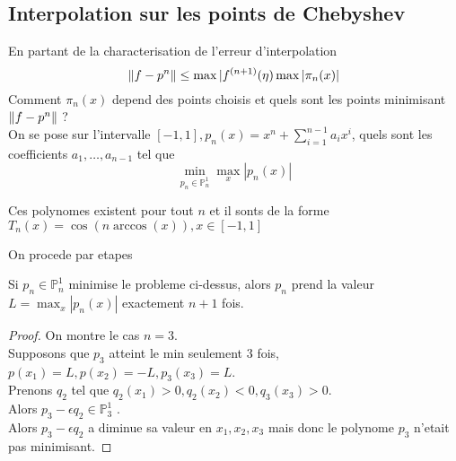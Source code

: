 \documentclass[../main.tex]{subfiles}
\begin{document}
\subsection{Interpolation sur les points de Chebyshev}
En partant de la characterisation de l'erreur d'interpolation
\[ 
\left\lVert f- p^{n}\right\rVert \leq  \max | f^{( n+1) } ( \eta) \max |\pi_n( x) |
\]
Comment $\pi_n( x) $ depend des points choisis et quels sont les points minimisant $ \left\lVert f-p^{n}\right\rVert $ ?\\
On se pose sur l'intervalle $ [ -1,1], p_n( x) = x^{n} +  \sum_{ i=1}^{n-1} a_i x^{i} $, quels sont les coefficients $a_1,\ldots, a_{n-1} $ tel que 
\[ 
\min_{p_n \in \mathbb{P}_n^{1}} \max_{x} |p_n( x) |
\]
\begin{thm}
	Ces polynomes existent pour tout $n$ et il sonts de la forme $T_n( x) = \cos ( n \arccos( x) ) , x\in [ -1,1] $ 
\end{thm}
On procede par etapes
\begin{propo}
Si $p_n\in \mathbb{P}_n^{1}$ minimise le probleme ci-dessus, alors $p_n$ prend la valeur $L = \max_{x} |p_n( x) |$ exactement $n+1$ fois.
\end{propo}
\begin{proof}
On montre le cas $n=3$.\\
Supposons que $p_3$ atteint le min seulement 3 fois, $p( x_1) =L, p( x_2) = -L, p_3 ( x_3) = L$.\\
Prenons $q_2$ tel que $ q_2( x_1) > 0 , q_2( x_2) < 0 , q_3( x_3) >0$.\\
Alors $ p_3- \epsilon q_2 \in \mathbb{P}_3^{1 }$ .\\
Alors $p_3-\epsilon q_2$ a diminue sa valeur en $x_1,x_2,x_3$ mais donc le polynome $p_3$ n'etait pas minimisant.
\end{proof}
\end{document}
